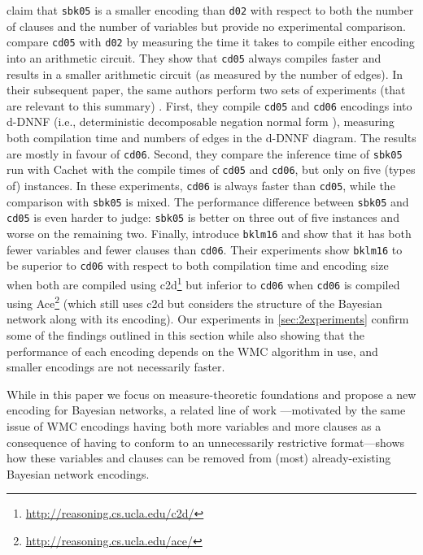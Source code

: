 \citet{DBLP:conf/aaai/SangBK05} claim that
\texttt{sbk05} is a smaller encoding than \texttt{d02} with respect to both the
number of clauses and the number of variables but provide no experimental
comparison. \citet{DBLP:conf/ijcai/ChaviraD05} compare \texttt{cd05} with
\texttt{d02} by measuring the time it takes to compile either encoding into an
arithmetic circuit. They show that
\texttt{cd05} always compiles faster and results in a smaller arithmetic circuit
(as measured by the number of edges). In their subsequent paper, the same
authors perform two sets of experiments (that are relevant to this summary)
\citep{DBLP:conf/sat/ChaviraD06}. First, they compile \texttt{cd05} and
\texttt{cd06} encodings into d-DNNF (i.e., deterministic decomposable negation
normal form \citep{DBLP:journals/jancl/Darwiche01}), measuring both compilation
time and numbers of edges in the d-DNNF diagram. The results are mostly in
favour of \texttt{cd06}. Second, they compare the inference time of
\texttt{sbk05} run with \textsf{Cachet} \citep{DBLP:conf/sat/SangBBKP04} with
the compile times of \texttt{cd05} and \texttt{cd06}, but only on five (types
of) instances. In these experiments, \texttt{cd06} is always faster than
\texttt{cd05}, while the comparison with \texttt{sbk05} is mixed.  The
performance difference between \texttt{sbk05} and \texttt{cd05} is even harder
to judge: \texttt{sbk05} is better on three out of five instances and worse on
the remaining two. Finally, \citet{DBLP:conf/ecai/BartKLM16} introduce
\texttt{bklm16} and show that it has both fewer variables and fewer clauses than
\texttt{cd06}. Their experiments show \texttt{bklm16} to be superior to
\texttt{cd06} with respect to both compilation time and encoding size when both
are compiled using
\textsf{c2d}\footnote{\url{http://reasoning.cs.ucla.edu/c2d/}}
\citep{DBLP:conf/ecai/Darwiche04} but inferior to \texttt{cd06} when
\texttt{cd06} is compiled using
\textsf{Ace}\footnote{\url{http://reasoning.cs.ucla.edu/ace/}} (which still uses
\textsf{c2d} but considers the structure of the Bayesian network along with its
encoding). Our experiments in \cref{sec:2experiments} confirm some of the
findings outlined in this section while also showing that the performance of
each encoding depends on the WMC algorithm in use, and smaller encodings are not
necessarily faster.

While in this paper we focus on measure-theoretic foundations and propose a
new encoding for Bayesian networks, a related line of work
\citep{my_sat_paper}---motivated by the same issue of WMC encodings having both
more variables and more clauses as a consequence of having to conform to an
unnecessarily restrictive format---shows how these variables and clauses can be
removed from (most) already-existing Bayesian network encodings.

